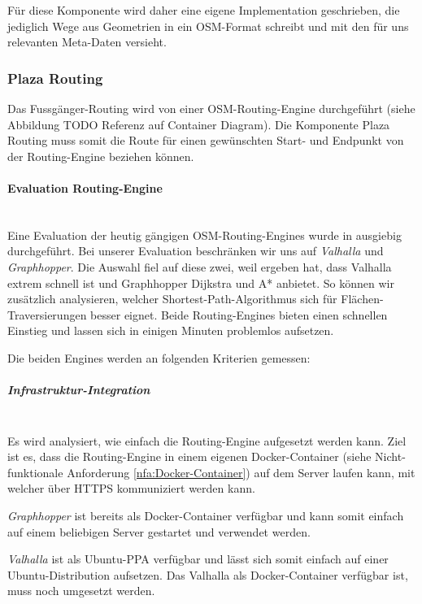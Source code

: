 Für diese Komponente wird daher eine eigene Implementation geschrieben, die jediglich Wege aus Geometrien in ein \ac{OSM}-Format schreibt und mit den für uns relevanten Meta-Daten versieht.

\subsubsection{Plaza Routing}
\label{architektur:Plaza Routing}
Das Fussgänger-Routing wird von einer \ac{OSM}-Routing-Engine durchgeführt (siehe Abbildung TODO Referenz auf Container Diagram). Die Komponente Plaza Routing muss somit die Route für einen gewünschten Start- und Endpunkt von der Routing-Engine beziehen können.

\paragraph{Evaluation Routing-Engine}~\\
\label{architektur:Evaluation Routing-Engine}
Eine Evaluation der heutig gängigen \ac{OSM}-Routing-Engines wurde in \cite{eval_routing_engine} ausgiebig durchgeführt. Bei unserer Evaluation beschränken wir uns auf \emph{Valhalla}\cite{valhalla} und \emph{Graphhopper}\cite{graphhopper}. Die Auswahl fiel auf diese zwei, weil \cite{eval_routing_engine} ergeben hat, dass Valhalla extrem schnell ist und Graphhopper Dijkstra und A* anbietet. So können wir zusätzlich analysieren, welcher Shortest-Path-Algorithmus sich für Flächen-Traversierungen besser eignet. Beide Routing-Engines bieten einen schnellen Einstieg und lassen sich in einigen Minuten problemlos aufsetzen.

Die beiden Engines werden an folgenden Kriterien gemessen:

\subparagraph{Infrastruktur-Integration}~\\
\label{architektur:Infrastruktur-Integration}
Es wird analysiert, wie einfach die Routing-Engine aufgesetzt werden kann. Ziel ist es, dass die Routing-Engine in einem eigenen Docker-Container (siehe Nicht-funktionale Anforderung \ref{nfa:Docker-Container}) auf dem Server laufen kann, mit welcher über HTTPS kommuniziert werden kann.

\emph{Graphhopper} ist bereits als Docker-Container verfügbar und kann somit einfach auf einem beliebigen Server gestartet und verwendet werden.

\emph{Valhalla} ist als Ubuntu-\ac{PPA} verfügbar und lässt sich somit einfach auf einer Ubuntu-Distribution aufsetzen. Das Valhalla als Docker-Container verfügbar ist, muss noch umgesetzt werden.

